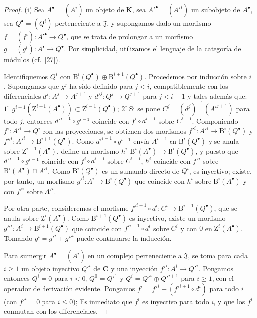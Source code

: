 \begin{proof}
{\rm(i)}
Sea $A^\bullet=(A^i)$ un objeto de $\boldsymbol{K}$, sea $A'^\bullet=(A'^i)$ un subobjeto de $A^\bullet$, sea $Q^\bullet=(Q^i)$ perteneciente a $\mathfrak J$, y supongamos dado un morfismo
$f=(f^i):A'^\bullet\to Q^\bullet$, que se trata de prolongar a un morfismo $g=(g^i):A^\bullet\to Q^\bullet$.
Por simplicidad, utilizamos el lenguaje de la categoría de módulos (cf.~[27]).

Identifiquemos $Q^i$ con $\mathrm B^i(Q^\bullet)\oplus\mathrm B^{i+1}(Q^\bullet)$.
Procedemos por inducción sobre $i$.
Supongamos que $g^j$ ha sido definido para $j<i$, compatiblemente con los diferenciales $d^j:A^j\to A^{j+1}$ y $d'^j:Q^j\to Q^{j+1}$ para $j<i-1$ y tales además que: $1^\circ$ $g^{i-1}(\mathrm Z^{i-1}(A^\bullet))\subset
\mathrm Z^{i-1}(Q^\bullet)$; $2^\circ$ Si se pone $C^j=(d^j)^{-1}(A'^{j+1})$ para todo $j$, entonces $d'^{i-1}\circ g^{i-1}$ coincide con $f^i\circ d^{i-1}$ sobre $C^{i-1}$.
Componiendo $f^i:A'^i\to Q^i$ con las proyecciones, se obtienen dos morfismos $f'^i:A'^i\to\mathrm B^i(Q^\bullet)$ y $f''^i:A'^i\to\mathrm B^{i+1}(Q^\bullet)$. Como $d'^{i-1}\circ g^{i-1}$ envía $A^{i-1}$ en $\mathrm B^i(Q^\bullet)$ y se anula sobre $\mathrm Z^{i-1}(A^\bullet)$, define un morfismo
$h^i:\mathrm B^i(A^\bullet)\to\mathrm B^i(Q^\bullet)$, y puesto que $d'^{i-1}\circ g^{i-1}$ coincide con $f^i\circ d^{i-1}$ sobre $C^{i-1}$, $h^i$ coincide con $f'^i$ sobre $\mathrm B^i(A^\bullet)\cap A'^i$.
Como $\mathrm B^i(Q^\bullet)$ es un sumando directo de $Q^i$, es inyectivo; existe, por tanto, un morfismo
$g'^i:A^i\to\mathrm B^i(Q^\bullet)$
que coincide con $h^i$ sobre $\mathrm B^i(A^\bullet)$ y con $f'^i$ sobre $A'^i$.

Por otra parte, consideremos el morfismo
$f'^{i+1}\circ d^i:C^i\to\mathrm B^{i+1}(Q^\bullet)$,
que se anula sobre $\mathrm Z^i(A^\bullet)$.
Como $\mathrm B^{i+1}(Q^\bullet)$ es inyectivo, existe un morfismo
$g''^i:A^i\to\mathrm B^{i+1}(Q^\bullet)$
que coincide con $f'^{i+1}\circ d^i$ sobre $C^i$ y con $0$ en $\mathrm Z^i(A^\bullet)$.
Tomando $g^i=g'^i+g''^i$ puede continuarse la inducción.

\smallskip
{}
Para sumergir $A^\bullet=(A^i)$ en un complejo perteneciente a $\mathfrak J$, se toma para cada $i\geq1$ un objeto inyectivo $Q'^i$ de $\boldsymbol{C}$ y una inyección $f'^i:A^i\to Q'^i$. Pongamos entonces $Q^i=0$ para $i<0$, $Q^0=Q'^1$ y $Q^i=Q'^i\oplus Q'^{i+1}$ para $i\geq1$, con el operador de derivación evidente. Pongamos
$f^i=f'^i+(f'^{i+1}\circ d^i)$ para todo $i$ (con $f'^i=0$ para $i\leq0$);
Es inmediato que $f^i$ es inyectivo para todo $i$, y que los $f^i$ conmutan con los diferenciales.
\end{proof}


